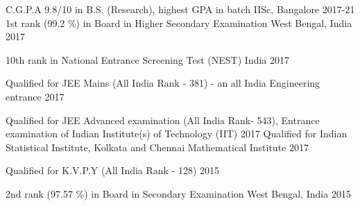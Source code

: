 




\begin{cvhonors}

  \cvhonor
{C.G.P.A} %
{9.8/10 in B.S. (Research), highest GPA in batch} %
{IISc, Bangalore} %
{2017-21} %
  \cvhonor
    {1st rank (99.2 \%) in Board} %
    {in Higher Secondary Examination} %
    {West Bengal, India} %
    {2017} %

  \cvhonor
    {} %
    {10th rank in National Entrance Screening Test (NEST)} %
    {India} %
    {2017} %

  \cvhonor
	{} %
	{Qualified for JEE Mains (All India Rank - 381) - an all India Engineering entrance} %
	{} %
	{2017} %
	 
	\cvhonor
	{} %
	{Qualified for JEE Advanced examination (All India Rank- 543), Entrance examination of Indian Institute(s) of Technology (IIT)} %
	{} %
	{2017} %
  \cvhonor
    {} %
    {Qualified for Indian Statistical Institute, Kolkata and Chennai Mathematical Institute} %
    {} %
    {2017} %

  \cvhonor
    {} %
    {Qualified for K.V.P.Y (All India Rank - 128)} %
    {} %
    {2015} %

  \cvhonor
    {2nd rank (97.57 \%) in Board} %
    {in Secondary Examination} %
    {West Bengal, India} %
    {2015} %

\end{cvhonors}

